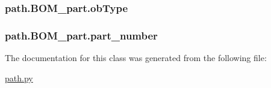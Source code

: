 \subsubsection[{ob\+Type}]{\setlength{\rightskip}{0pt plus 5cm}path.\+B\+O\+M\+\_\+part.\+ob\+Type}\label{classpath_1_1_b_o_m__part_a31d55f12a538e30fb1dc24ea12fe4307}
\hypertarget{classpath_1_1_b_o_m__part_abcb9678bf4b051d9aa937552149d7333}{}
\subsubsection[{part\+\_\+number}]{\setlength{\rightskip}{0pt plus 5cm}path.\+B\+O\+M\+\_\+part.\+part\+\_\+number}\label{classpath_1_1_b_o_m__part_abcb9678bf4b051d9aa937552149d7333}


The documentation for this class was generated from the following file\+:\begin{DoxyCompactItemize}
\item 
\hyperlink{path_8py}{path.\+py}\end{DoxyCompactItemize}
